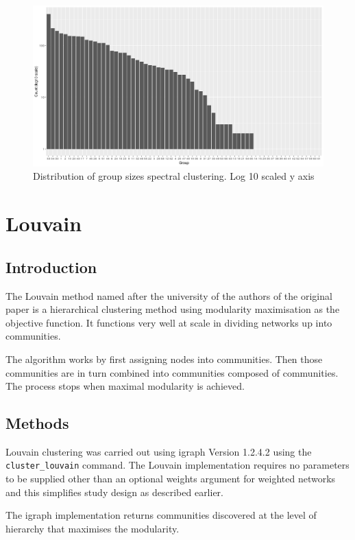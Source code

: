 \begin{figure}
    \centering
    \includegraphics[width=\textwidth]{images/Rplot_spectral_groups_size_log10.png}
    \caption{Distribution of group sizes spectral clustering. Log 10 scaled y axis}
    \label{fig:group sizes spectral clustering log 10}
\end{figure}
\section{Louvain}


\subsection{Introduction}
The Louvain method named after the university of the authors of the original paper is a hierarchical clustering method using modularity maximisation as the objective function. It functions very well at scale in dividing networks up into communities.\cite{blondel2008fast}

The algorithm works by first assigning nodes into communities. Then those communities are in turn combined into communities composed of communities. The process stops when maximal modularity is achieved. 

\subsection{Methods}

Louvain clustering was carried out using igraph Version 1.2.4.2 using the \texttt{cluster\_louvain} command. The Louvain implementation requires no parameters to be supplied other than an optional weights argument for weighted networks and this simplifies study design as described earlier. 

The igraph implementation returns communities discovered at the level of hierarchy that maximises the modularity.

